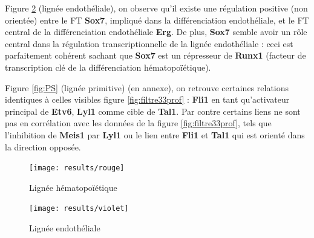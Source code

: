 \documentclass[fleqn,11pt]{SelfArx} %
\begin{document}
\par Figure \ref{fig:4SFG} (lignée endothéliale), on observe qu'il existe une régulation positive (non orientée) entre le FT \textbf{Sox7}, impliqué dans la différenciation endothéliale, et le FT central de la différenciation endothéliale \textbf{Erg}. De plus, \textbf{Sox7} semble avoir un rôle central dans la régulation transcriptionnelle de la lignée endothéliale : ceci est parfaitement cohérent sachant que \textbf{Sox7} est un répresseur de \textbf{Runx1} (facteur de transcription clé de la différenciation hématopoïétique)\cite{Moignard}.

\par Figure \ref{fig:PS} (lignée primitive) (en annexe), on retrouve certaines relations identiques à celles visibles figure \ref{fig:filtre33prof} : \textbf{Fli1} en tant qu'activateur principal de \textbf{Etv6}, \textbf{Lyl1} comme cible de \textbf{Tal1}. Par contre certains liens ne sont pas en corrélation avec les données de la figure \ref{fig:filtre33prof}, tels que l'inhibition de \textbf{Meis1} par \textbf{Lyl1} ou le lien entre \textbf{Fli1} et \textbf{Tal1} qui est orienté dans la direction opposée. 

\begin{figure}[ht]
\centering
\texttt{[image: results/rouge]}
\caption{Lignée hématopoïétique}
\label{fig:4SG}
\end{figure}

\begin{figure}[ht]
\centering
\texttt{[image: results/violet]}
\caption{Lignée endothéliale}
\label{fig:4SFG}
\end{figure}
\end{document}
